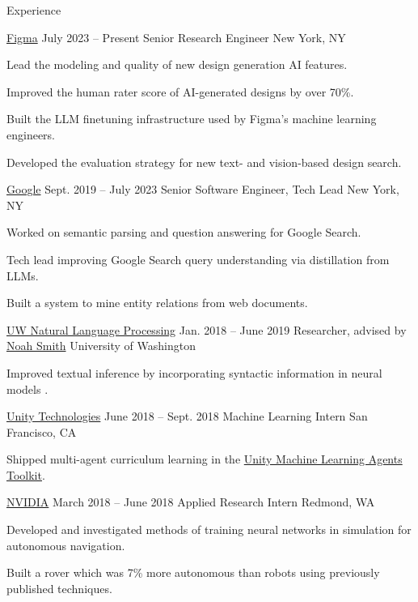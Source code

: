 \documentclass{resume}
\begin{document}
\begin{rSection}{Experience}
	\begin{rSubsection}{\href{https://www.figma.com/careers/}
			{Figma}}
		{July 2023 -- Present}
		{Senior Research Engineer}
		{New York, NY}
		\item Lead the modeling and quality of new design generation AI features.
		\item Improved the human rater score of AI-generated designs by over 70\%.
		\item Built the LLM finetuning infrastructure used by Figma's machine learning engineers.
		\item Developed the evaluation strategy for new text- and vision-based design search.
	\end{rSubsection}

	\begin{rSubsection}{\href{https://careers.google.com/locations/new-york/}
			{Google}}
		{Sept. 2019 -- July 2023}
		{Senior Software Engineer, Tech Lead}
		{New York, NY}
		\item Worked on semantic parsing and question answering for Google Search.
		\item Tech lead improving Google Search query understanding via distillation from LLMs.
		\item Built a system to mine entity relations from web documents.
	\end{rSubsection}

	\begin{rSubsection}{\href{https://nlp.washington.edu/}
			{UW Natural Language Processing}}
		{Jan. 2018 -- June 2019}
		{Researcher, advised by
			\href{https://homes.cs.washington.edu/~nasmith/}
			{Noah Smith}}
		{University of Washington}
		\item Improved textual inference by incorporating syntactic
		information in neural models \citep{pang2019improving}.
	\end{rSubsection}

	\begin{rSubsection}{{\href{https://unity.com/}{Unity Technologies}}}
		{June 2018 -- Sept. 2018}
		{Machine Learning Intern}
		{San Francisco, CA}
		\item Shipped multi-agent curriculum learning in the
		\href{https://unity.com/products/machine-learning-agents}
		{Unity Machine Learning Agents Toolkit}.
	\end{rSubsection}

	\begin{rSubsection}{{\href{http://www.nvidia.com/page/home.html}{NVIDIA}}}
		{March 2018 -- June 2018}
		{Applied Research Intern}
		{Redmond, WA}
		\item Developed and investigated methods of training neural networks in
		simulation for autonomous navigation.
		\item Built a rover which was 7\% more autonomous than robots using
		previously published techniques.
	\end{rSubsection}


\end{rSection}
\end{document}
